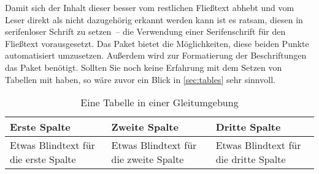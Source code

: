 \documentclass[%
  english,ngerman,%
  geometry=no,DIV=12,automark,%
]{tudscrartcl}
\begin{document}
Damit sich der Inhalt dieser besser vom restlichen Fließtext abhebt und vom 
Leser direkt als nicht dazugehörig erkannt werden kann ist es ratsam, diesen in 
serifenloser Schrift zu setzen~-- die Verwendung einer Serifenschrift für den 
Fließtext vorausgesetzt. Das Paket  bietet die Möglichkeiten, 
diese beiden Punkte automatisiert umzusetzen. Außerdem wird zur Formatierung 
der Beschriftungen das Paket  benötigt. Sollten Sie noch keine 
Erfahrung mit dem Setzen von Tabellen mit  haben, so wäre zuvor 
ein Blick in \autoref{sec:tables} sehr sinnvoll. 

\newcommand*\tableexample[1][]{%
  \begin{tabularx}{.75\textwidth}{@{}XXX@{}}
  \toprule
  \textbf{Erste Spalte} & \textbf{Zweite Spalte} & 
  \textbf{Dritte Spalte} \tabularnewline
  \midrule
  Etwas Blindtext für die erste Spalte &
  Etwas Blindtext für die zweite Spalte &
  Etwas Blindtext für die dritte Spalte
  \tabularnewline
  \bottomrule
  \end{tabularx}
  #1%
}
\begin{table}
\tableexample[%
  \caption{Eine Tabelle in einer Gleitumgebung}\label{tab:tabular}%
]
\end{table}
\end{document}

